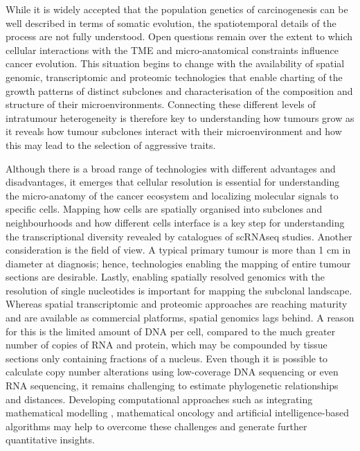 While it is widely accepted that the population genetics of carcinogenesis can be well described in terms of somatic evolution, the spatiotemporal details of the process are not fully understood. Open questions remain over the extent to which cellular interactions with the \ac{TME} and micro-anatomical constraints influence cancer evolution. This situation begins to change with the availability of spatial genomic, transcriptomic and proteomic technologies that enable charting of the growth patterns of distinct subclones and characterisation of the composition and structure of their microenvironments. Connecting these different levels of intratumour heterogeneity is therefore key to understanding how tumours grow as it reveals how tumour subclones interact with their microenvironment and how this may lead to the selection of aggressive traits.

Although there is a broad range of technologies with different advantages and disadvantages, it emerges that cellular resolution is essential for understanding the micro-anatomy of the cancer ecosystem and localizing molecular signals to specific cells. Mapping how cells are spatially organised into subclones and neighbourhoods and how different cells interface is a key step for understanding the transcriptional diversity revealed by catalogues of \ac{scRNAseq} studies. Another consideration is the field of view. A typical primary tumour is more than 1 cm in diameter at diagnosis; hence, technologies enabling the mapping of entire tumour sections are desirable. Lastly, enabling spatially resolved genomics with the resolution of single nucleotides is important for mapping the subclonal landscape. Whereas spatial transcriptomic and proteomic approaches are reaching maturity and are available as commercial platforms, spatial genomics lags behind. A reason for this is the limited amount of DNA per cell, compared to the much greater number of copies of RNA and protein, which may be compounded by tissue sections only containing fractions of a nucleus. Even though it is possible to calculate copy number alterations using low-coverage DNA sequencing or even RNA sequencing, it remains challenging to estimate phylogenetic relationships and distances. Developing computational approaches such as integrating mathematical modelling \parencite{Gatenbee2022-hb}, mathematical oncology and artificial intelligence-based algorithms may help to overcome these challenges and generate further quantitative insights.

